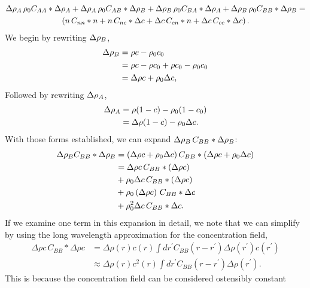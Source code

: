 %
\begin{gather}\label{1}
      \Delta \rho_A \,\rho_0 C_{AA} \ast \Delta \rho_A 
    + \Delta \rho_A \,\rho_0 C_{AB} \ast \Delta \rho_B 
    + \Delta \rho_B \,\rho_0 C_{BA} \ast \Delta \rho_A 
    + \Delta \rho_B \,\rho_0 C_{BB} \ast \Delta \rho_B = \\ \nonumber
       \left(n \,C_{nn} \ast n 
        + n \,C_{nc} \ast \Delta c 
        + \Delta c \,C_{cn}\ast n 
        + \Delta c \,C_{cc} \ast \Delta c\right).
\end{gather}
%
We begin by rewriting $\Delta \rho_B$,
%
\begin{align*}
  \Delta \rho_B &= \rho c - \rho_0 c_0 \\
        &= \rho c - \rho c_0 + \rho c_0 - \rho_0 c_0 \\
        &= \Delta \rho c + \rho_0 \Delta c,
\end{align*}
%
Followed by rewriting $\Delta \rho_A$,
%
\begin{align*}
  \Delta \rho_A &= \rho (1 - c) - \rho_0 (1 - c_0) \\
        &= \Delta \rho (1 - c) - \rho_0 \Delta c.
\end{align*}
%
With those forms established, we can expand $\Delta \rho_B \,C_{BB} \ast \Delta \rho_B$:
%
\begin{align}\label{this}
  \Delta \rho_B C_{BB} \ast \Delta \rho_B &= \left(\Delta \rho c + \rho_0 \Delta c \right) C_{BB} \ast \left(\Delta \rho c + \rho_0 \Delta c\right) \nonumber\\
                          &= \Delta \rho c \,C_{BB} \ast \left( \Delta \rho c\right) \nonumber\\
                          &+ \rho_0 \Delta c \,C_{BB} \ast \left( \Delta \rho c \right) \\
                          &+ \rho_0 \left(\Delta \rho c\right) \,C_{BB} \ast \Delta c \nonumber\\
                          &+ \rho_0^2 \Delta c \,C_{BB} \ast \Delta c. \nonumber
\end{align}
%
If we examine one term in this expansion in detail, we note that we can
simplify by using the long wavelength approximation for the concentration
field,
%
\begin{align}
  \Delta \rho c \, C_{BB} \ast \Delta \rho c &= \Delta \rho(r) c(r) \int dr^\prime C_{BB}(r - r^\prime) \Delta \rho(r^\prime) c(r^\prime) \nonumber \\
                                     &\approx \Delta \rho(r) c^2(r) \int dr^\prime C_{BB}(r - r^\prime) \Delta \rho(r^\prime).
\end{align}
%
This is because the concentration field can be considered ostensibly constant
